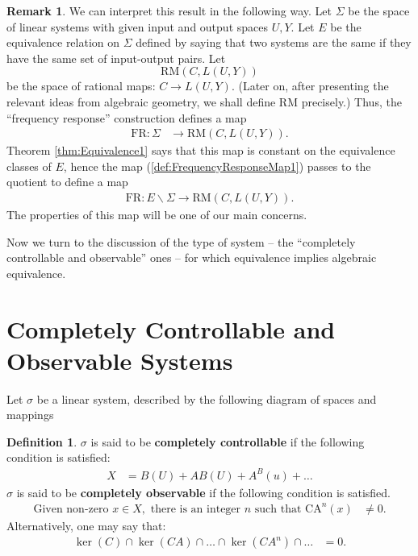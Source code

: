 \documentclass[12pt]{book}
\theoremstyle{plain}
\theoremstyle{definition}
\newtheorem{definition}{Definition}[section]
\newtheorem*{remark}{Remark}
\begin{document}
\begin{remark}
    We can interpret this result in the following way.
    Let $\Sigma$ be the space of linear systems with given input and output spaces $U, Y$.
    Let $E$ be the equivalence relation on $\Sigma$ defined by saying that two systems are the same if they have the same set of input-output pairs.
    Let
    $$\textrm{RM}(C, L(U, Y))$$
    be the space of rational maps: $C \to L(U, Y)$.
    (Later on, after presenting the relevant ideas from algebraic geometry, we shall define $\textrm{RM}$ precisely.)
    Thus, the ``frequency response'' construction defines a map
    \begin{align} \label{def:FrequencyResponseMap1}
        \textrm{FR}: \Sigma &\to \textrm{RM}(C, L(U, Y)).
    \end{align}
    Theorem \ref{thm:Equivalence1} says that this map is constant on the equivalence classes of $E$, hence the map (\ref{def:FrequencyResponseMap1}) passes to the quotient to define a map
    \begin{align}
        \textrm{FR}: E\backslash\Sigma \to \textrm{RM}(C, L(U, Y)).
    \end{align}
    The properties of this map will be one of our main concerns.
\end{remark}

Now we turn to the discussion of the type of system -- the ``completely controllable and observable'' ones -- for which equivalence implies algebraic equivalence.

\section{Completely Controllable and Observable Systems}
Let $\sigma$ be a linear system, described by the following diagram of spaces and mappings

\begin{definition}
    $\sigma$ is said to be \textbf{completely controllable} if the following condition is satisfied:
    \begin{align}
        X &= B(U) + AB(U) + A^B(u) + \dots
    \end{align}
    $\sigma$ is said to be \textbf{completely observable} if the following condition is satisfied.
    \begin{align} \label{eq:CompletelyObservableCondition1}
        \text{Given non-zero } x \in X, \text{ there is an integer } n \text{ such that } \textrm{CA}^n(x) &\neq 0.
    \end{align}
    Alternatively, one may say that:
    \begin{align} \label{eq:CompletelyObservableCondition2}
        \ker(C) \cap \ker(CA) \cap \dots \cap  \ker(CA^n) \cap \dots &= 0.
    \end{align}
\end{definition}
\end{document}
